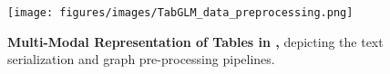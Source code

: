 \begin{figure}[t]
        \centering
        \texttt{[image: figures/images/TabGLM\_data\_preprocessing.png]}
        \caption{\textbf{Multi-Modal Representation of Tables in \tabglm,} depicting the text serialization and graph pre-processing pipelines.}
        \label{fig:data_preprocessing}
\end{figure}